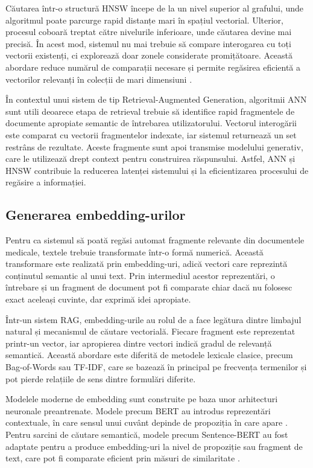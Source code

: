 \documentclass[12pt, a4paper, oneside, romanian]{teza-upb}
\begin{document}
Căutarea într-o structură HNSW începe de la un nivel superior al grafului, unde algoritmul poate parcurge rapid distanțe mari în spațiul vectorial. Ulterior, procesul coboară treptat către nivelurile inferioare, unde căutarea devine mai precisă. În acest mod, sistemul nu mai trebuie să compare interogarea cu toți vectorii existenți, ci explorează doar zonele considerate promițătoare. Această abordare reduce numărul de comparații necesare și permite regăsirea eficientă a vectorilor relevanți în colecții de mari dimensiuni \cite{malkov2018hnsw}.

În contextul unui sistem de tip Retrieval-Augmented Generation, algoritmii ANN sunt utili deoarece etapa de retrieval trebuie să identifice rapid fragmentele de documente apropiate semantic de întrebarea utilizatorului. Vectorul interogării este comparat cu vectorii fragmentelor indexate, iar sistemul returnează un set restrâns de rezultate. Aceste fragmente sunt apoi transmise modelului generativ, care le utilizează drept context pentru construirea răspunsului. Astfel, ANN și HNSW contribuie la reducerea latenței sistemului și la eficientizarea procesului de regăsire a informației.

\subsection{Generarea embedding-urilor}

Pentru ca sistemul să poată regăsi automat fragmente relevante din documentele medicale, textele trebuie transformate într-o formă numerică. Această transformare este realizată prin embedding-uri, adică vectori care reprezintă conținutul semantic al unui text. Prin intermediul acestor reprezentări, o întrebare și un fragment de document pot fi comparate chiar dacă nu folosesc exact aceleași cuvinte, dar exprimă idei apropiate.

Într-un sistem RAG, embedding-urile au rolul de a face legătura dintre limbajul natural și mecanismul de căutare vectorială. Fiecare fragment este reprezentat printr-un vector, iar apropierea dintre vectori indică gradul de relevanță semantică. Această abordare este diferită de metodele lexicale clasice, precum Bag-of-Words sau TF-IDF, care se bazează în principal pe frecvența termenilor și pot pierde relațiile de sens dintre formulări diferite.

Modelele moderne de embedding sunt construite pe baza unor arhitecturi neuronale preantrenate. Modele precum BERT au introdus reprezentări contextuale, în care sensul unui cuvânt depinde de propoziția în care apare \cite{devlin2018bert}. Pentru sarcini de căutare semantică, modele precum Sentence-BERT au fost adaptate pentru a produce embedding-uri la nivel de propoziție sau fragment de text, care pot fi comparate eficient prin măsuri de similaritate \cite{reimers2019sbert}.
\end{document}
